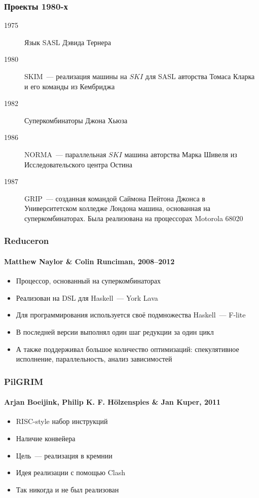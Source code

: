 \documentclass[aspectratio=169]{beamer}
\begin{document}
\begin{frame}
    \frametitle{Проекты 1980-х}

    \begin{description}
        \item[1975] Язык SASL Дэвида Тернера
        \item[1980] SKIM~--- реализация машины на $SKI$ для SASL авторства Томаса Кларка и его команды из Кембриджа
        \item[1982] Суперкомбинаторы Джона Хьюза
        \item[1986] NORMA~--- параллельная $SKI$ машина авторства Марка Шивеля из Исследовательского центра Остина
        \item[1987] GRIP~--- созданная командой Саймона Пейтона Джонса в Университетском колледже Лондона машина, основанная на суперкомбинаторах.
            Была реализована на процессорах Motorola 68020
    \end{description}

\end{frame}

\begin{frame}
    \frametitle{Reduceron}
    \framesubtitle{Matthew Naylor \& Colin Runciman, 2008--2012}

    \begin{itemize}
        \item Процессор, основанный на суперкомбинаторах
        \item Реализован на DSL для Haskell~--- York Lava
        \item Для программирования используется своё подмножества Haskell~--- F-lite
        \item В последней версии выполнял один шаг редукции за один цикл
        \item А также поддерживал большое количество оптимизаций: спекулятивное исполнение, параллельность, анализ зависимостей
    \end{itemize}

\end{frame}

\begin{frame}
    \frametitle{PilGRIM}
    \framesubtitle{Arjan Boeijink, Philip K. F. Hölzenspies \& Jan Kuper, 2011}

    \begin{itemize}
        \item RISC-style набор инструкций
        \item Наличие конвейера
        \item Цель~--- реализация в кремнии
        \item Идея реализации с помощью Clash
        \item Так никогда и не был реализован
    \end{itemize}

\end{frame}
\end{document}
